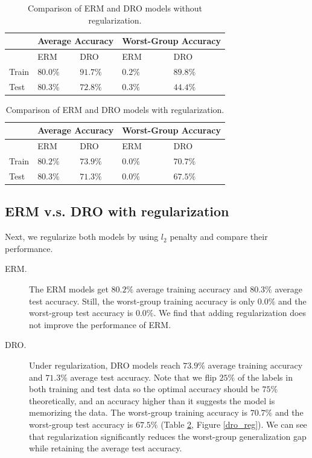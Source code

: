 \documentclass{article}
\begin{document}
\begin{table}[h!]
\centering
\begin{tabular}{ |p{1cm}|p{2cm}|p{2cm}|p{2cm}|p{2cm}|  }
\hline
& \multicolumn{2}{|c|}{Average Accuracy} & \multicolumn{2}{|c|}{Worst-Group Accuracy} \\
\hline
 & ERM & DRO & ERM & DRO \\
\hline
Train & $80.0\%$ & $91.7\%$ & $0.2\%$ & $89.8\%$ \\
\hline
Test & $80.3\%$ & $72.8\%$ & $0.3\%$ & $44.4\%$ \\
\hline
\end{tabular}
\caption{Comparison of ERM and DRO models without regularization.}
\label{table:nreg}
\end{table}

\begin{table}[h!]
\centering
\begin{tabular}{ |p{1cm}|p{2cm}|p{2cm}|p{2cm}|p{2cm}|  }
\hline
& \multicolumn{2}{|c|}{Average Accuracy} & \multicolumn{2}{|c|}{Worst-Group Accuracy} \\
\hline
 & ERM & DRO & ERM & DRO \\
\hline
Train & $80.2\%$ & $73.9\%$ & $0.0\%$ & $70.7\%$ \\
\hline
Test & $80.3\%$ & $71.3\%$ & $0.0\%$ & $67.5\%$ \\
\hline
\end{tabular}
\caption{Comparison of ERM and DRO models with regularization.}
\label{table:reg}
\end{table}

\subsection{ERM v.s. DRO with regularization}
Next, we regularize both models by using $l_2$ penalty and compare their performance.
\begin{description}
    \item[ERM.]The ERM models get $80.2\%$ average training accuracy and $80.3\%$
    average test accuracy. Still, the worst-group training accuracy is only $0.0\%$ and the worst-group test accuracy is $0.0\%$. We find that adding regularization does not improve the performance of ERM.
    \item[DRO.] Under regularization, DRO models reach $73.9\%$ average training accuracy and $71.3\%$ average test accuracy. Note that we flip $25\%$ of the labels in both training and test data so the optimal accuracy should be $75\%$ theoretically, and an accuracy higher than it suggests the model is memorizing the data. The worst-group training accuracy is $70.7\%$ and the worst-group test accuracy is $67.5\%$ (Table \ref{table:reg}, Figure \ref{dro_reg}). We can see that regularization significantly reduces the worst-group generalization gap while retaining the average test accuracy.
\end{description}
\end{document}
